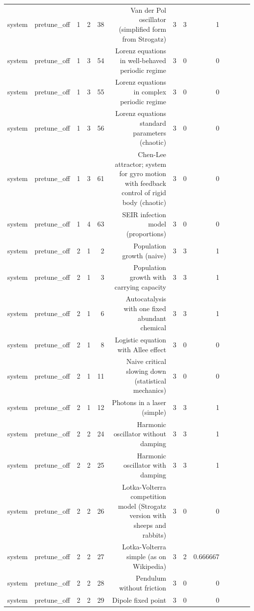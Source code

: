 \begin{table}[htbp]
\begin{tabular}{lrrrrrrrrrrrr}
system & pretune\_off & 1 & 2 & 38 & Van der Pol oscillator (simplified form from Strogatz) & 3 & 3 & 1 &  &  &  &  \\
system & pretune\_off & 1 & 3 & 54 & Lorenz equations in well-behaved periodic regime & 3 & 0 & 0 &  &  &  &  \\
system & pretune\_off & 1 & 3 & 55 & Lorenz equations in complex periodic regime & 3 & 0 & 0 &  &  &  &  \\
system & pretune\_off & 1 & 3 & 56 & Lorenz equations standard parameters (chaotic) & 3 & 0 & 0 &  &  &  &  \\
system & pretune\_off & 1 & 3 & 61 & Chen-Lee attractor; system for gyro motion with feedback control of rigid body (chaotic) & 3 & 0 & 0 &  &  &  &  \\
system & pretune\_off & 1 & 4 & 63 & SEIR infection model (proportions) & 3 & 0 & 0 &  &  &  &  \\
system & pretune\_off & 2 & 1 & 2 & Population growth (naive) & 3 & 3 & 1 &  &  &  &  \\
system & pretune\_off & 2 & 1 & 3 & Population growth with carrying capacity & 3 & 3 & 1 &  &  &  &  \\
system & pretune\_off & 2 & 1 & 6 & Autocatalysis with one fixed abundant chemical & 3 & 3 & 1 &  &  &  &  \\
system & pretune\_off & 2 & 1 & 8 & Logistic equation with Allee effect & 3 & 0 & 0 &  &  &  &  \\
system & pretune\_off & 2 & 1 & 11 & Naive critical slowing down (statistical mechanics) & 3 & 0 & 0 &  &  &  &  \\
system & pretune\_off & 2 & 1 & 12 & Photons in a laser (simple) & 3 & 3 & 1 &  &  &  &  \\
system & pretune\_off & 2 & 2 & 24 & Harmonic oscillator without damping & 3 & 3 & 1 &  &  &  &  \\
system & pretune\_off & 2 & 2 & 25 & Harmonic oscillator with damping & 3 & 3 & 1 &  &  &  &  \\
system & pretune\_off & 2 & 2 & 26 & Lotka-Volterra competition model (Strogatz version with sheeps and rabbits) & 3 & 0 & 0 &  &  &  &  \\
system & pretune\_off & 2 & 2 & 27 & Lotka-Volterra simple (as on Wikipedia) & 3 & 2 & 0.666667 &  &  &  &  \\
system & pretune\_off & 2 & 2 & 28 & Pendulum without friction & 3 & 0 & 0 &  &  &  &  \\
system & pretune\_off & 2 & 2 & 29 & Dipole fixed point & 3 & 0 & 0 &  &  &  &  \\

\end{tabular}
\end{table}
